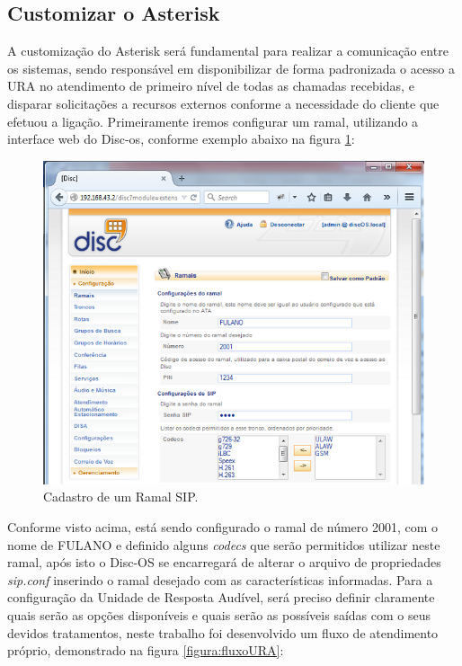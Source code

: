 \subsection{Customizar o Asterisk}

A customização do Asterisk será fundamental para realizar a comunicação entre os sistemas, sendo responsável em disponibilizar de forma padronizada o acesso a URA no atendimento de primeiro nível de todas as chamadas recebidas, e disparar solicitações a recursos externos conforme a necessidade do cliente que efetuou a ligação.
Primeiramente iremos configurar um ramal, utilizando a interface web do Disc-os, conforme exemplo abaixo na figura \ref{figura:cadastroRamapSIP}:


\begin{figure}[!htb]
	\centering
	\caption{Cadastro de um Ramal SIP.}	
	\label{figura:cadastroRamapSIP}
	\includegraphics{figuras/cadastro_ramal_sip.png}
\end{figure}


Conforme visto acima, está sendo configurado o ramal de número 2001, com o nome de FULANO e definido alguns \textit{codecs} que serão permitidos utilizar neste ramal, após isto o Disc-OS se encarregará de alterar o arquivo de propriedades \textit{sip.conf} inserindo o ramal desejado com as características informadas.
Para a configuração da Unidade de Resposta Audível, será preciso definir claramente quais serão as opções disponíveis e quais serão as possíveis saídas com o seus devidos tratamentos, neste trabalho foi desenvolvido um fluxo de atendimento próprio, demonstrado na figura \ref{figura:fluxoURA}: 

